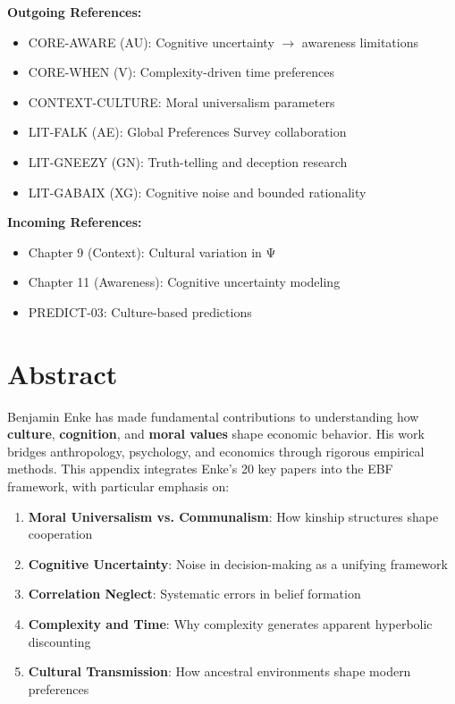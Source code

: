 \begin{tcolorbox}[colback=green!5!white, colframe=green!75!black, title=Cross-Reference Map]
\textbf{Outgoing References:}
\begin{itemize}[nosep]
    \item CORE-AWARE (AU): Cognitive uncertainty $\rightarrow$ awareness limitations
    \item CORE-WHEN (V): Complexity-driven time preferences
    \item CONTEXT-CULTURE: Moral universalism parameters
    \item LIT-FALK (AE): Global Preferences Survey collaboration
    \item LIT-GNEEZY (GN): Truth-telling and deception research
    \item LIT-GABAIX (XG): Cognitive noise and bounded rationality
\end{itemize}

\textbf{Incoming References:}
\begin{itemize}[nosep]
    \item Chapter 9 (Context): Cultural variation in Ψ
    \item Chapter 11 (Awareness): Cognitive uncertainty modeling
    \item PREDICT-03: Culture-based predictions
\end{itemize}
\end{tcolorbox}

\section*{Abstract}

Benjamin Enke has made fundamental contributions to understanding how \textbf{culture}, \textbf{cognition}, and \textbf{moral values} shape economic behavior. His work bridges anthropology, psychology, and economics through rigorous empirical methods. This appendix integrates Enke's 20 key papers into the EBF framework, with particular emphasis on:
\begin{enumerate}
    \item \textbf{Moral Universalism vs. Communalism}: How kinship structures shape cooperation
    \item \textbf{Cognitive Uncertainty}: Noise in decision-making as a unifying framework
    \item \textbf{Correlation Neglect}: Systematic errors in belief formation
    \item \textbf{Complexity and Time}: Why complexity generates apparent hyperbolic discounting
    \item \textbf{Cultural Transmission}: How ancestral environments shape modern preferences
\end{enumerate}

